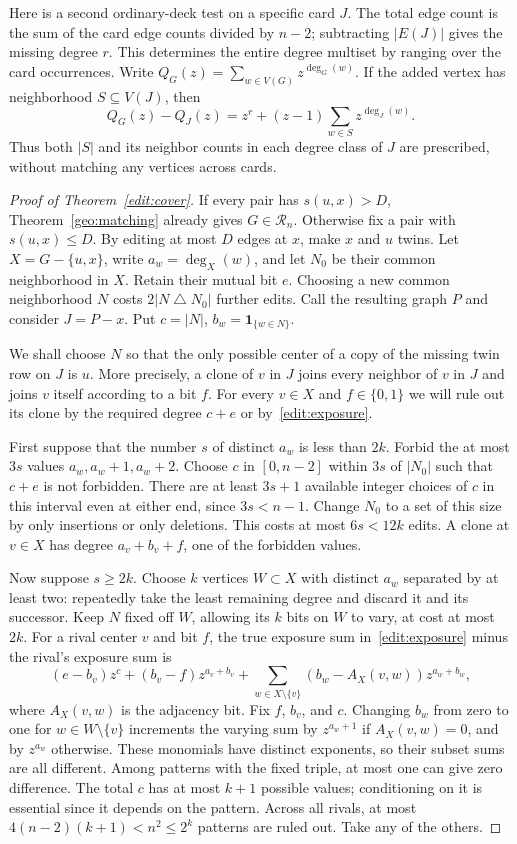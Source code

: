 Here is a second ordinary-deck test on a specific card $J$. The total
edge count is the sum of the card edge counts divided by $n-2$; subtracting
$|E(J)|$ gives the missing degree $r$. This determines the entire degree
multiset by ranging over the card occurrences. Write
$Q_G(z)=\sum_{w\in V(G)}z^{\deg_G(w)}$. If the added vertex has
neighborhood $S\subseteq V(J)$, then
\begin{equation}\label{edit:exposure}
 Q_G(z)-Q_J(z)=z^r+(z-1)\sum_{w\in S}z^{\deg_J(w)} .
\end{equation}
Thus both $|S|$ and its neighbor counts in each degree class of $J$ are
prescribed, without matching any vertices across cards.

\begin{proof}[Proof of Theorem~\ref{edit:cover}]
If every pair has $s(u,x)>D$, Theorem~\ref{geo:matching} already gives
$G\in\mathcal R_n$. Otherwise fix a pair with $s(u,x)\le D$. By editing
at most $D$ edges at $x$, make $x$ and $u$ twins. Let $X=G-\{u,x\}$,
write $a_w=\deg_X(w)$, and let $N_0$ be their common neighborhood in
$X$. Retain their mutual bit $e$. Choosing a new common neighborhood
$N$ costs $2|N\mathbin{\triangle}N_0|$ further edits. Call the resulting
graph $P$ and consider $J=P-x$. Put $c=|N|$, $b_w=\mathbf 1_{\{w\in N\}}$.

We shall choose $N$ so that the only possible center of a copy of the
missing twin row on $J$ is $u$. More precisely, a clone of $v$ in $J$
joins every neighbor of $v$ in $J$ and joins $v$ itself according to
a bit $f$. For every $v\in X$ and $f\in\{0,1\}$ we will rule out
its clone by the required degree $c+e$ or by~\eqref{edit:exposure}.

First suppose that the number $s$ of distinct $a_w$ is less than $2k$.
Forbid the at most $3s$ values $a_w,a_w+1,a_w+2$. Choose $c$ in
$[0,n-2]$ within $3s$ of $|N_0|$ such that $c+e$ is not forbidden.
There are at least $3s+1$ available integer choices of $c$ in this
interval even at either end, since $3s<n-1$. Change $N_0$ to a set
of this size by only insertions or only deletions. This costs at most
$6s<12k$ edits. A clone at $v\in X$ has degree $a_v+b_v+f$, one of
the forbidden values.

Now suppose $s\ge2k$. Choose $k$ vertices $W\subset X$ with distinct
$a_w$ separated by at least two: repeatedly take the least remaining
degree and discard it and its successor. Keep $N$ fixed off $W$, allowing
its $k$ bits on $W$ to vary, at cost at most $2k$. For a rival center $v$
and bit $f$, the true exposure sum in~\eqref{edit:exposure} minus the
rival's exposure sum is
\[
 (e-b_v)z^c+(b_v-f)z^{a_v+b_v}
 +\sum_{w\in X\setminus\{v\}}(b_w-A_X(v,w))z^{a_w+b_w},
\]
where $A_X(v,w)$ is the adjacency bit. Fix $f$, $b_v$, and $c$. Changing
$b_w$ from zero to one for $w\in W\setminus\{v\}$ increments the varying
sum by $z^{a_w+1}$ if $A_X(v,w)=0$, and by $z^{a_w}$ otherwise.
These monomials have distinct exponents, so their subset sums are all
different. Among patterns with the fixed triple, at most one can give
zero difference. The total $c$ has at most $k+1$ possible values;
conditioning on it is essential since it depends on the pattern.
Across all rivals, at most $4(n-2)(k+1)<n^2\le2^k$ patterns are ruled
out. Take any of the others.


\end{proof}
